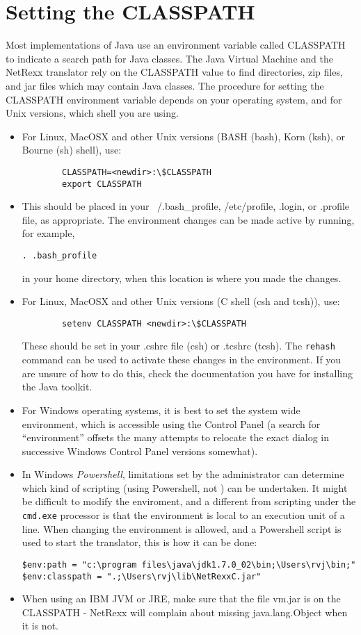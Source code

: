 \section{Setting the CLASSPATH}\label{install_classpath}
Most implementations of Java use an environment variable called CLASSPATH to indicate a search path for Java classes. The Java Virtual Machine and the NetRexx translator rely on the CLASSPATH value to find directories, zip files, and jar files which may contain Java classes. 
The procedure for setting the CLASSPATH environment variable depends
on your operating system, and for Unix versions, which shell you are using.
\begin{itemize}
\item For Linux, MacOSX and other Unix versions (BASH (bash), Korn
  (ksh), or Bourne (sh) shell), use:
\begin{verbatim}
        CLASSPATH=<newdir>:\$CLASSPATH 
        export CLASSPATH
\end{verbatim}

\item This should be placed
  in your ~/.bash\_profile, /etc/profile, .login, or .profile file, as
  appropriate. The environment changes can be made active by running,
  for example,
\begin{verbatim}
. .bash_profile
\end{verbatim}
in your home directory, when this location is where you made the changes.
\item For Linux, MacOSX and other Unix versions (C shell (csh and tcsh)), use:
\begin{verbatim}
        setenv CLASSPATH <newdir>:\$CLASSPATH 
\end{verbatim}
These should be set in your .cshrc file (csh) or .tcshrc (tcsh). The
\texttt{rehash} command can be used to activate these changes in the environment. If you are unsure of how to do this, check the
documentation you have for installing the Java toolkit.
\item For Windows operating systems, it is best to set the system wide
  environment, which is accessible using the Control Panel (a search
  for ``environment'' offsets the many attempts to relocate the exact
  dialog in successive Windows Control Panel versions somewhat).
\item In Windows \emph{Powershell}, limitations set by the
  administrator can determine which kind of scripting (using
  Powershell, not \nr) can be undertaken. It might be difficult to
  modify the enviroment, and a different from scripting under the
  \texttt{cmd.exe} processor is that the environment is local to an
  execution unit of a line. When changing the environment is allowed,
  and a Powershell script is used to start the \nr translator, this is
  how it can be done:
\begin{verbatim}
$env:path = "c:\program files\java\jdk1.7.0_02\bin;\Users\rvj\bin;"
$env:classpath = ".;\Users\rvj\lib\NetRexxC.jar"
\end{verbatim}
 \item When using an IBM JVM or JRE, make sure that the file vm.jar is
   on the CLASSPATH - NetRexx will complain about missing
   java.lang.Object when it is not.
\end{itemize}

